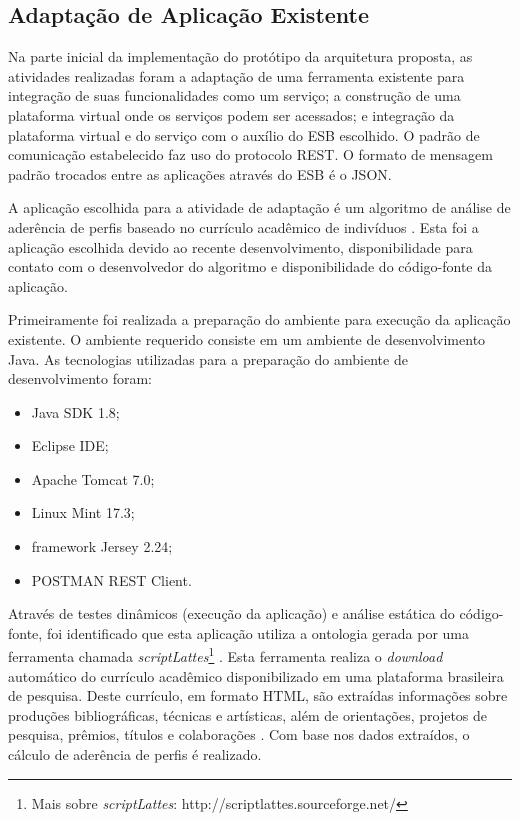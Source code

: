 \subsection{Adaptação de Aplicação Existente}
Na parte inicial da implementação do protótipo da arquitetura proposta, as atividades realizadas foram a adaptação de uma ferramenta existente para integração de suas funcionalidades como um serviço; a construção de uma plataforma virtual onde os serviços podem ser acessados; e integração da plataforma virtual e do serviço com o auxílio do ESB escolhido. O padrão de comunicação estabelecido faz uso do protocolo REST. O formato de mensagem padrão trocados entre as aplicações através do ESB é o JSON.

A aplicação escolhida para a atividade de adaptação é um algoritmo de análise de aderência de perfis baseado no currículo acadêmico de indivíduos \cite{jesus_algoritmo_2014}. Esta foi a aplicação escolhida devido ao recente desenvolvimento, disponibilidade para contato com o desenvolvedor do algoritmo e disponibilidade do código-fonte da aplicação.

Primeiramente foi realizada a preparação do ambiente para execução da aplicação existente. O ambiente requerido consiste em um ambiente de desenvolvimento Java. As tecnologias utilizadas para a preparação do ambiente de desenvolvimento foram:
\begin{itemize}
\item Java SDK 1.8;
\item Eclipse IDE;
\item Apache Tomcat 7.0;
\item Linux Mint 17.3;
\item framework Jersey 2.24;
\item POSTMAN REST Client.
\end{itemize}

Através de testes dinâmicos (execução da aplicação) e análise estática do código-fonte, foi identificado que esta aplicação utiliza a ontologia gerada por uma ferramenta chamada \textit{scriptLattes}\footnote{Mais sobre \textit{scriptLattes}: http://scriptlattes.sourceforge.net/} . Esta ferramenta realiza o \textit{download} automático do currículo acadêmico disponibilizado em uma plataforma brasileira de pesquisa. Deste currículo, em formato HTML, são extraídas informações sobre produções bibliográficas, técnicas e artísticas, além de orientações, projetos de pesquisa, prêmios, títulos e colaborações \cite{mena-chalco_scriptlattes:_2009}. Com base nos dados extraídos, o cálculo de aderência de perfis é realizado.

